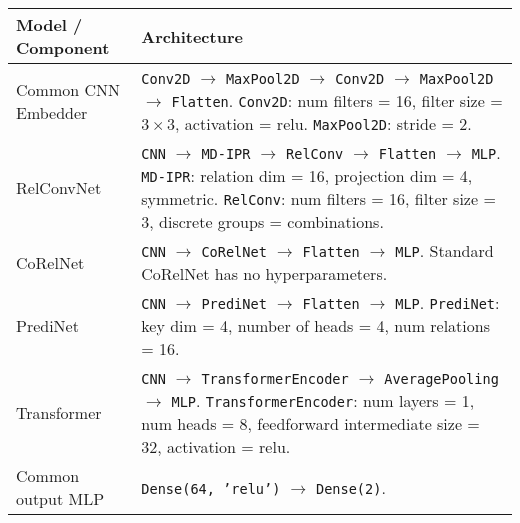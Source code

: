 \begin{tabular}{p{}p{}}
    \toprule
    Model / Component & Architecture \\ \midrule
    Common CNN \newline Embedder & \texttt{Conv2D} $\to$ \texttt{MaxPool2D} $\to$ \texttt{Conv2D} $\to$ \texttt{MaxPool2D} $\to$ \texttt{Flatten}. \newline
                        \texttt{Conv2D}: num filters = 16, filter size = $3 \times 3$, activation = relu. \newline
                        \texttt{MaxPool2D}: stride = 2. \\\hline
    RelConvNet        & \texttt{CNN} $\to$ \texttt{MD-IPR} $\to$ \texttt{RelConv} $\to$ \texttt{Flatten} $\to$ \texttt{MLP}. \newline
                        \texttt{MD-IPR}: relation dim = 16, projection dim = 4, symmetric. \newline
                        \texttt{RelConv}: num filters = 16, filter size = 3, discrete groups = combinations. \\\hline
    CoRelNet          & \texttt{CNN} $\to$ \texttt{CoRelNet} $\to$ \texttt{Flatten} $\to$ \texttt{MLP}. \newline
                        Standard CoRelNet has no hyperparameters. \\\hline
    PrediNet          & \texttt{CNN} $\to$ \texttt{PrediNet} $\to$ \texttt{Flatten} $\to$ \texttt{MLP}. \newline
                        \texttt{PrediNet}: key dim = 4, number of heads = 4, num relations = 16. \\\hline
    Transformer       & \texttt{CNN} $\to$ \texttt{TransformerEncoder} $\to$ \texttt{AveragePooling} $\to$ \texttt{MLP}. \newline
                    \texttt{TransformerEncoder}: num layers = 1, num heads = 8, feedforward intermediate size = 32, activation = relu. \\\hline
    Common output MLP & \texttt{Dense(64, 'relu')} $\to$ \texttt{Dense(2)}. \\ \bottomrule
\end{tabular}